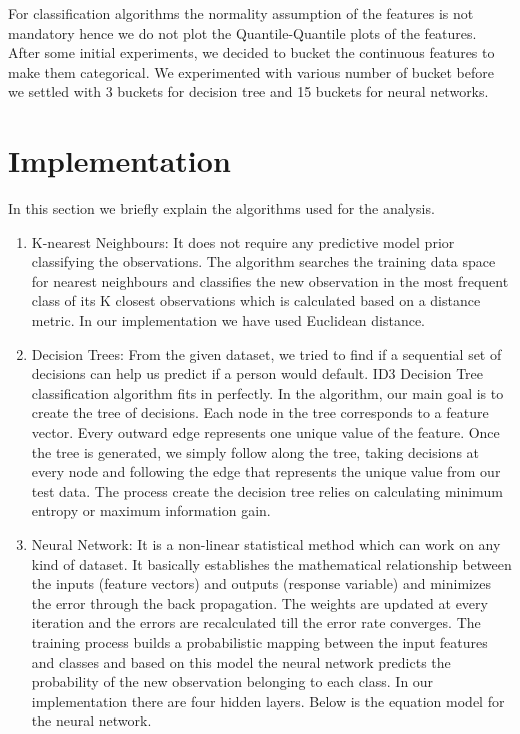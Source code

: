 \documentclass{article}
\begin{document}
\noindent For classification algorithms the normality assumption of the features is not mandatory hence we do not plot the Quantile-Quantile plots of the features. After some initial experiments, we decided to bucket the continuous features to make them categorical. We experimented with various number of bucket before we settled with 3 buckets for decision tree and 15 buckets for neural networks.


\section{Implementation}
 
In this section we briefly explain the algorithms used for the analysis. 

\begin{enumerate}

\item K-nearest Neighbours: It does not require any predictive model prior classifying the observations. The algorithm searches the training data space for nearest neighbours and classifies the new observation in the most frequent class of its K closest observations which is calculated based on a distance metric. In our implementation we have used Euclidean distance.

\item Decision Trees:  From the given dataset, we tried to find if a sequential set of decisions can help us predict if a person would default. ID3 Decision Tree classification  algorithm fits in perfectly. In the algorithm, our main goal is to create the tree of decisions. Each node in the tree corresponds to a feature vector. Every outward edge represents one unique value of the feature. Once the tree is generated, we simply follow along the tree, taking decisions at every node and following the edge that represents the unique value from our test data. The process create the decision tree relies on calculating minimum entropy or maximum information gain.

\item Neural Network: It is a non-linear statistical method which can work on any kind of dataset. It basically establishes the mathematical relationship between the inputs (feature vectors) and outputs (response variable) and minimizes the error through the back propagation. The weights are updated at every iteration and the errors are recalculated till the error rate converges. The training process builds a probabilistic mapping between the input features and classes and based on this model the neural network predicts the probability of the new observation belonging to each class. In our implementation there  are four hidden layers. Below is the equation model for the neural network.


\end{enumerate}
\end{document}
